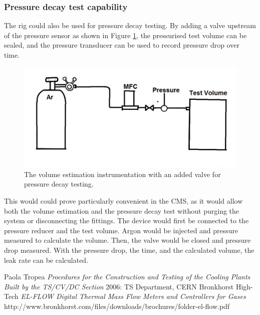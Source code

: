\documentclass{report}
\begin{document}
\subsubsection{Pressure decay test capability}
The rig could also be used for pressure decay testing. By adding a valve upstream of the pressure sensor as shown in Figure \ref{schematicWithValve}, the pressurised test volume can be sealed, and the pressure transducer can be used to record pressure drop over time. 
\begin{figure}[h]
\includegraphics[width=\textwidth]{schematicWithValve}
\caption{The volume estimation instrumentation with an added valve for pressure decay testing.}
\label{schematicWithValve}
\end{figure}
This would could prove particularly convenient in the CMS, as it would allow both the volume estimation and the pressure decay test without purging the system or disconnecting the fittings. The device would first be connected to the pressure reducer and the test volume. Argon would be injected and pressure measured to calculate the volume. Then, the valve would be closed and pressure drop measured. With the pressure drop, the time, and the calculated volume, the leak rate can be calculated. 

\begin{thebibliography}{1}
 Paola Tropea {\em Procedures for the Construction and Testing of the Cooling Plants Built by the TS/CV/DC Section} 2006: TS Department, CERN
 Bronkhorst High-Tech {\em EL-FLOW Digital Thermal Mass Flow Meters and Controllers for Gases} http://www.bronkhorst.com/files/downloads/brochures/folder-el-flow.pdf
\end{thebibliography}
\end{document}
